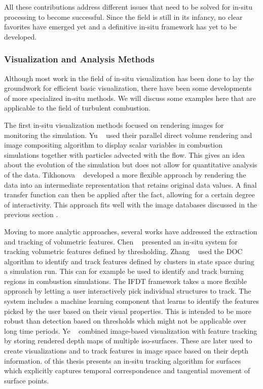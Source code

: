 %
All these contributions address different issues that need to be solved for
in-situ processing to become successful.
%
Since the field is still in its infancy, no clear favorites have emerged yet and
a definitive in-situ framework has yet to be developed.
%
%
\subsubsection{Visualization and Analysis Methods} %
\label{ssub:visualization_and_analysis_methods}
%
Although most work in the field of in-situ visualization has been done to lay
the groundwork for efficient basic visualization, there have been some
developments of more specialized in-situ methods.
%
We will discuss some examples here that are applicable to the field of turbulent
combustion.
%

%
The first in-situ visualization methods focused on rendering images for
monitoring the simulation.
%
Yu \etal~\cite{Yu2010} used their parallel direct volume rendering and image
compositing algorithm \cite{Yu2008} to display scalar variables in combustion
simulations together with particles advected with the flow.
%
This gives an idea about the evolution of the simulation but does not allow for
quantitative analysis of the data.
%
Tikhonova \etal~\cite{Tikhonova2011} developed a more flexible approach by
rendering the data into an intermediate representation that retains original
data values.
%
A final transfer function can then be applied after the fact, allowing for a
certain degree of interactivity.
%
This approach fits well with the image databases discussed in the previous
section \cite{Kageyama2014,Ahrens2014}.
%

%
Moving to more analytic approaches, several works have addressed the extraction
and tracking of volumetric features.
%
Chen \etal~\cite{Chen2003} presented an in-situ system for tracking volumetric
features defined by thresholding.
%
Zhang \etal~\cite{Zhang2012} used the \ac{DOC} algorithm \cite{Quiroz2008} to
identify and track features defined by clusters in state space during a
simulation run.
%
This can for example be used to identify and track burning regions in combustion
simulations.
%
The IFDT framework \cite{Duque2012} takes a more flexible approach by letting a
user interactively pick individual structures to track.
%
The system includes a machine learning component that learns to identify the
features picked by the user based on their visual properties.
%
This is intended to be more robust than detection based on thresholds which
might not be applicable over long time periods.
%
Ye \etal~\cite{Ye2015} combined image-based visualization with feature tracking
by storing rendered depth maps of multiple iso-surfaces.
%
These are later used to create visualizations and to track features in image
space based on their depth information.
%
 of this thesis presents an in-situ tracking
algorithm for surfaces which explicitly captures temporal correspondence and
tangential movement of surface points.
%

